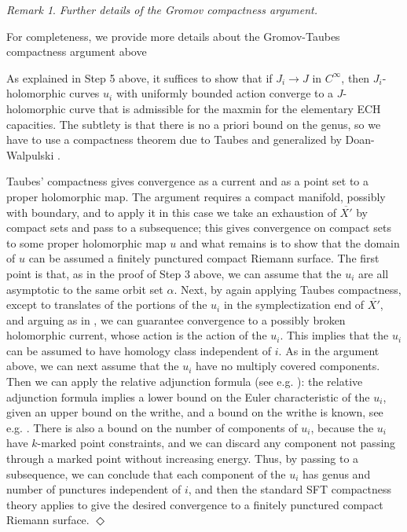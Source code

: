 \documentclass[11pt, reqno]{amsart}
\theoremstyle{remark}
\numberwithin{equation}{subsection}
\numberwithin{figure}{section}
\theoremstyle{customremark}
\newtheorem{rmk_no_diamond}[thm]{Remark}
\newenvironment{rmk}{\begin{rmk_no_diamond} } {\hfill$\er$ \end{rmk_no_diamond}}
\newcommand{\er}{{\Diamond}}
\begin{document}
\begin{rmk} \label{rmk:compact} {\it  Further details of the Gromov compactness argument.}

For completeness, we provide more details about the Gromov-Taubes compactness argument above

As explained in Step 5 above, it suffices to show that if $J_i \to J$ in $C^{\infty}$, then $J_i$-holomorphic curves $u_i$ with uniformly bounded action converge to a $J$-holomorphic curve that is admissible for the maxmin for the elementary ECH capacities.   The subtlety is that there is no a priori bound on the genus, so we have to use a compactness theorem due to Taubes and generalized by Doan-Walpulski \cite{dw}.

Taubes' compactness gives convergence as a current and as a point set to a proper holomorphic map.  
The argument  requires a compact manifold, possibly with boundary, and to apply it in this case we take an exhaustion of $\overline{X'}$ by compact sets and pass to a subsequence; this gives convergence on compact sets to some proper holomorphic map $u$  and what remains is to show that the domain of $u$ can be assumed a finitely punctured compact Riemann surface.  The first point is that, as in the proof of Step 3 above, we can assume that the $u_i$ are all asymptotic to the same orbit set $\alpha$.  Next, by again applying Taubes compactness, except to translates of the portions of the $u_i$ in the symplectization end of $\overline{X'}$, and 
arguing as in \cite[Lem. 5.11]{hutchings_lecture},
we can guarantee convergence to a possibly broken holomorphic current, whose action is the action of the $u_i$.  This implies that the $u_i$ can be assumed to have homology class independent of $i$.  As in the argument above, we can next assume that the $u_i$ have no multiply covered components.  Then we can apply the relative adjunction formula (see e.g. \cite[Eq. (3.3)]{hutchings_lecture}): the relative adjunction formula implies a lower bound on the Euler characteristic of the $u_i$, given an upper bound on the writhe, and a bound on the writhe is known, see e.g. \cite[Eq. (3.9)]{hutchings_lecture}.  There is also a bound on the number of components of $u_i$, because the $u_i$ have $k$-marked point constraints, and we can discard any component not passing through a marked point without increasing energy.  Thus, by passing to a subsequence, we can conclude that each component of the $u_i$ has genus and number of punctures independent of $i$, and then the standard SFT compactness theory applies to give the desired convergence to a finitely punctured compact Riemann surface.
\end{rmk}
\end{document}
